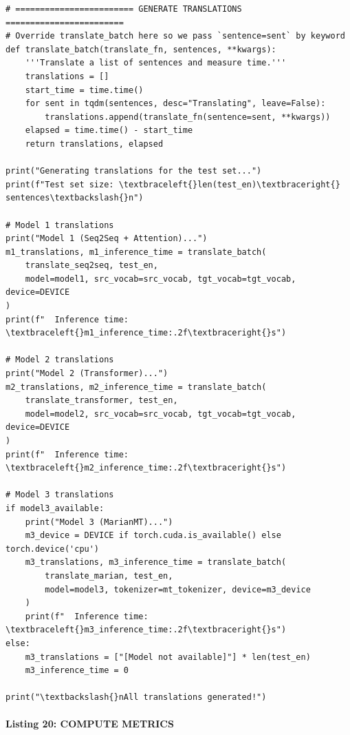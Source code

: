 \documentclass[12pt,a4paper,oneside]{report}
\begin{document}
\begin{Verbatim}[commandchars=\\\{\},breaklines=true,breakanywhere=true,fontsize=\scriptsize,frame=leftline,framesep=2mm,rulecolor=\color{gray}]
# ======================== GENERATE TRANSLATIONS ========================
# Override translate_batch here so we pass `sentence=sent` by keyword
def translate_batch(translate_fn, sentences, **kwargs):
    '''Translate a list of sentences and measure time.'''
    translations = []
    start_time = time.time()
    for sent in tqdm(sentences, desc="Translating", leave=False):
        translations.append(translate_fn(sentence=sent, **kwargs))
    elapsed = time.time() - start_time
    return translations, elapsed

print("Generating translations for the test set...")
print(f"Test set size: \textbraceleft{}len(test_en)\textbraceright{} sentences\textbackslash{}n")

# Model 1 translations
print("Model 1 (Seq2Seq + Attention)...")
m1_translations, m1_inference_time = translate_batch(
    translate_seq2seq, test_en,
    model=model1, src_vocab=src_vocab, tgt_vocab=tgt_vocab, device=DEVICE
)
print(f"  Inference time: \textbraceleft{}m1_inference_time:.2f\textbraceright{}s")

# Model 2 translations
print("Model 2 (Transformer)...")
m2_translations, m2_inference_time = translate_batch(
    translate_transformer, test_en,
    model=model2, src_vocab=src_vocab, tgt_vocab=tgt_vocab, device=DEVICE
)
print(f"  Inference time: \textbraceleft{}m2_inference_time:.2f\textbraceright{}s")

# Model 3 translations
if model3_available:
    print("Model 3 (MarianMT)...")
    m3_device = DEVICE if torch.cuda.is_available() else torch.device('cpu')
    m3_translations, m3_inference_time = translate_batch(
        translate_marian, test_en,
        model=model3, tokenizer=mt_tokenizer, device=m3_device
    )
    print(f"  Inference time: \textbraceleft{}m3_inference_time:.2f\textbraceright{}s")
else:
    m3_translations = ["[Model not available]"] * len(test_en)
    m3_inference_time = 0

print("\textbackslash{}nAll translations generated!")
\end{Verbatim}
\paragraph{Listing 20: COMPUTE METRICS}\mbox{}\\[-1ex]
\end{document}
